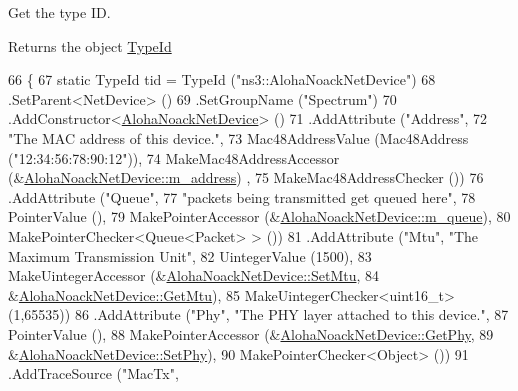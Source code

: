 Get the type ID. 

\begin{DoxyReturn}{Returns}
the object \hyperlink{classns3_1_1TypeId}{Type\+Id} 
\end{DoxyReturn}

\begin{DoxyCode}
66 \{
67   \textcolor{keyword}{static} TypeId tid = TypeId (\textcolor{stringliteral}{"ns3::AlohaNoackNetDevice"})
68     .SetParent<NetDevice> ()
69     .SetGroupName (\textcolor{stringliteral}{"Spectrum"})
70     .AddConstructor<\hyperlink{classns3_1_1AlohaNoackNetDevice_abe170e79ce7a7bed6cfaffc16d2be4dd}{AlohaNoackNetDevice}> ()
71     .AddAttribute (\textcolor{stringliteral}{"Address"},
72                    \textcolor{stringliteral}{"The MAC address of this device."},
73                    Mac48AddressValue (Mac48Address (\textcolor{stringliteral}{"12:34:56:78:90:12"})),
74                    MakeMac48AddressAccessor (&\hyperlink{classns3_1_1AlohaNoackNetDevice_a166639a91b87662cb798ead280bee700}{AlohaNoackNetDevice::m\_address})
      ,
75                    MakeMac48AddressChecker ())
76     .AddAttribute (\textcolor{stringliteral}{"Queue"},
77                    \textcolor{stringliteral}{"packets being transmitted get queued here"},
78                    PointerValue (),
79                    MakePointerAccessor (&\hyperlink{classns3_1_1AlohaNoackNetDevice_a0c402bb86cd8d2475751d8198ddb3b10}{AlohaNoackNetDevice::m\_queue}),
80                    MakePointerChecker<Queue<Packet> > ())
81     .AddAttribute (\textcolor{stringliteral}{"Mtu"}, \textcolor{stringliteral}{"The Maximum Transmission Unit"},
82                    UintegerValue (1500),
83                    MakeUintegerAccessor (&\hyperlink{classns3_1_1AlohaNoackNetDevice_ae33c8e6e61a301d261e415feda358f49}{AlohaNoackNetDevice::SetMtu},
84                                          &\hyperlink{classns3_1_1AlohaNoackNetDevice_a32fa3100b6d183928d52e963730234ff}{AlohaNoackNetDevice::GetMtu}),
85                    MakeUintegerChecker<uint16\_t> (1,65535))
86     .AddAttribute (\textcolor{stringliteral}{"Phy"}, \textcolor{stringliteral}{"The PHY layer attached to this device."},
87                    PointerValue (),
88                    MakePointerAccessor (&\hyperlink{classns3_1_1AlohaNoackNetDevice_a523fb1664663a8f4257570ef80e81f1b}{AlohaNoackNetDevice::GetPhy},
89                                         &\hyperlink{classns3_1_1AlohaNoackNetDevice_ac8a0d32cb0c1cdfe27091473eccb0396}{AlohaNoackNetDevice::SetPhy}),
90                    MakePointerChecker<Object> ())
91     .AddTraceSource (\textcolor{stringliteral}{"MacTx"},

\end{DoxyCode}
